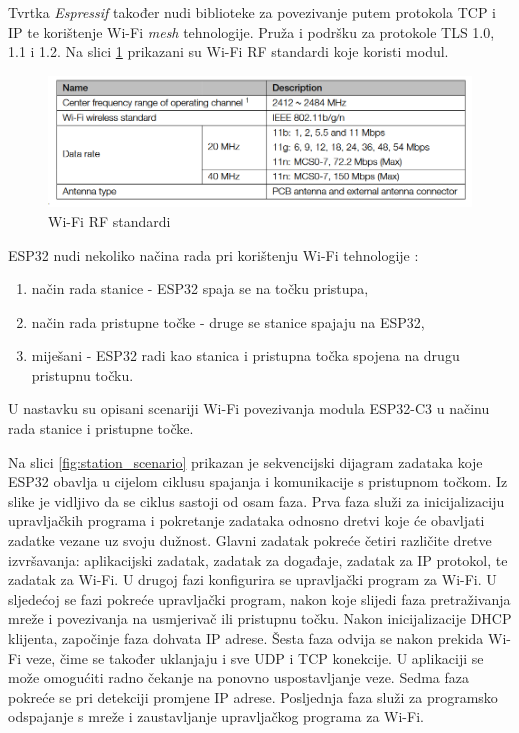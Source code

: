 Tvrtka \textit{Espressif} također nudi biblioteke za povezivanje putem protokola TCP i IP te korištenje Wi-Fi \textit{mesh} tehnologije. Pruža i podršku za protokole TLS 1.0, 1.1 i 1.2. Na slici \ref{fig:wifi_rf_table} prikazani su Wi-Fi RF standardi koje koristi modul. 

\begin{figure}[ht]
	\centering
	\includegraphics[scale=0.5]{imgs/wifi_rf_table}
	\caption{Wi-Fi RF standardi \cite{esp_mini}}
	\label{fig:wifi_rf_table}
\end{figure}

ESP32 nudi nekoliko načina rada pri korištenju Wi-Fi tehnologije \cite{esp_wifi_connect_overview}:
\begin{enumerate}
	\item način rada stanice  - ESP32 spaja se na točku pristupa,
	\item način rada pristupne točke  - druge se stanice spajaju na ESP32,
	\item miješani - ESP32 radi kao stanica i pristupna točka spojena na drugu pristupnu točku. 
\end{enumerate}

U nastavku su opisani scenariji Wi-Fi povezivanja modula ESP32-C3 u načinu rada stanice i pristupne točke.

Na slici \ref{fig:station_scenario} prikazan je sekvencijski dijagram zadataka koje ESP32 obavlja u cijelom ciklusu spajanja i komunikacije s pristupnom točkom. Iz slike je vidljivo da se ciklus sastoji od osam faza. Prva faza služi za inicijalizaciju upravljačkih programa i pokretanje zadataka odnosno dretvi koje će obavljati zadatke vezane uz svoju dužnost. Glavni zadatak pokreće četiri različite dretve izvršavanja: aplikacijski zadatak, zadatak za događaje, zadatak za IP protokol, te zadatak za Wi-Fi. U drugoj fazi konfigurira se upravljački program za Wi-Fi. U sljedećoj se fazi pokreće upravljački program, nakon koje slijedi faza pretraživanja mreže i povezivanja na usmjerivač ili pristupnu točku. Nakon inicijalizacije DHCP klijenta, započinje faza dohvata IP adrese. Šesta faza odvija se nakon prekida Wi-Fi veze, čime se također uklanjaju i sve UDP i TCP konekcije. U aplikaciji se može omogućiti radno čekanje na ponovno uspostavljanje veze. Sedma faza pokreće se pri detekciji promjene IP adrese. Posljednja faza služi za programsko odspajanje s mreže i zaustavljanje upravljačkog programa za Wi-Fi.

